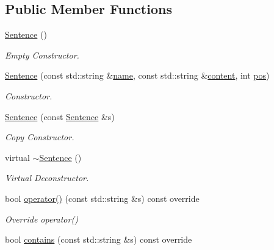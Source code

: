 \subsection*{Public Member Functions}
\begin{DoxyCompactItemize}
\item 
\hyperlink{class_sentence_aa767c3de8aaf7f2e30fa7524cdfcaead}{Sentence} ()
\begin{DoxyCompactList}\small\item\em Empty Constructor. \end{DoxyCompactList}\item 
\hyperlink{class_sentence_af493870ce2b1718f57a979319af9e7a7}{Sentence} (const std\+::string \&\hyperlink{class_index_item_a059cbae312c51ae7d02050f8f325bf93}{name}, const std\+::string \&\hyperlink{class_index_item_a2b5b4451bcb2fd50328bdc5b470d6296}{content}, int \hyperlink{class_sentence_af98c9ff5c5be578e7e45057ebd9b899b}{pos})
\begin{DoxyCompactList}\small\item\em Constructor. \end{DoxyCompactList}\item 
\mbox{\label{class_sentence_a66492f63af03eabbb7b0faa10ab8b85e}} 
\hyperlink{class_sentence_a66492f63af03eabbb7b0faa10ab8b85e}{Sentence} (const \hyperlink{class_sentence}{Sentence} \&s)
\begin{DoxyCompactList}\small\item\em Copy Constructor. \end{DoxyCompactList}\item 
\mbox{\label{class_sentence_a27635745fc2f7328c75c299e4f382a10}} 
virtual \hyperlink{class_sentence_a27635745fc2f7328c75c299e4f382a10}{$\sim$\+Sentence} ()
\begin{DoxyCompactList}\small\item\em Virtual Deconstructor. \end{DoxyCompactList}\item 
bool \hyperlink{class_sentence_aacbd8da0eeadd6a544f00c7ea4169c79}{operator()} (const std\+::string \&s) const override
\begin{DoxyCompactList}\small\item\em Override operator() \end{DoxyCompactList}\item 
bool \hyperlink{class_sentence_a867c17dbf3ef55c8708faa120ffad162}{contains} (const std\+::string \&s) const override

\end{DoxyCompactItemize}
